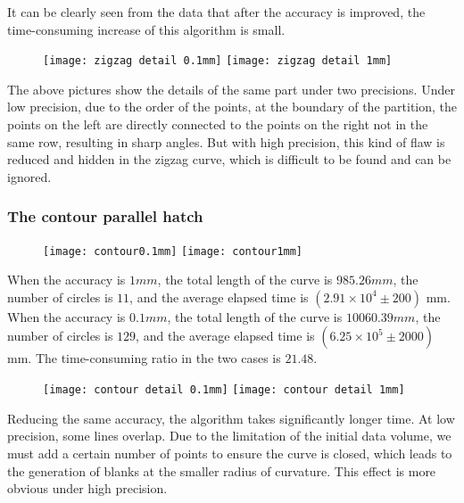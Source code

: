 \documentclass{apmcmthesis}
\begin{document}
It can be clearly seen from the data that after the accuracy is improved, the time-consuming increase of this algorithm is small.

\begin{figure}[!ht]
  \centering
  \texttt{[image: zigzag detail 0.1mm]} \quad \texttt{[image: zigzag detail 1mm]}
  \caption{}
  \caption{}
\end{figure}

The above pictures show the details of the same part under two precisions. Under low precision, due to the order of the points, at the boundary of the partition, the points on the left are directly connected to the points on the right not in the same row, resulting in sharp angles. But with high precision, this kind of flaw is reduced and hidden in the zigzag curve, which is difficult to be found and can be ignored.

\subsubsection{The contour parallel hatch}


\begin{figure}[!ht]
  \centering
  \texttt{[image: contour0.1mm]} \quad \texttt{[image: contour1mm]}
  \caption{}
  \caption{}
\end{figure}

When the accuracy is $1mm$, the total length of the curve is $985.26mm$, the number of circles is $11$, and the average elapsed time is $(2.91\times 10^4\pm 200)$ mm. When the accuracy is $0.1mm$, the total length of the curve is $10060.39mm$, the number of circles is $129$, and the average elapsed time is $(6.25\times 10^5\pm 2000)$ mm. The time-consuming ratio in the two cases is $21.48$.


\begin{figure}[!ht]
  \centering
  \texttt{[image: contour detail 0.1mm]} \quad \texttt{[image: contour detail 1mm]}
  \caption{}
  \caption{}
\end{figure}

Reducing the same accuracy, the algorithm takes significantly longer time. At low precision, some lines overlap. Due to the limitation of the initial data volume, we must add a certain number of points to ensure the curve is closed, which leads to the generation of blanks at the smaller radius of curvature. This effect is more obvious under high precision.
\end{document}
